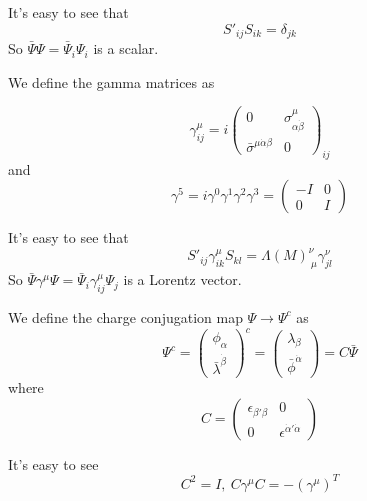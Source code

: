 \documentclass[12pt]{book}
\begin{document}
	It's easy to see that 
	\begin{equation}
		S'_{ij}S_{ik}=\delta_{jk}
	\end{equation}
	So $\bar\Psi \Psi=\bar\Psi_i \Psi_i$ is a scalar.
	
	We define the gamma matrices as
	
	\begin{equation}
		\gamma^\mu_{ij}=i\begin{pmatrix}
			0&\sigma^\mu_{\alpha\dot\beta}\\
			\bar\sigma^{\mu\dot\alpha\beta}&0
		\end{pmatrix}_{ij}
	\end{equation}
	and
	\begin{equation}
		\gamma^5=i\gamma^0\gamma^1\gamma^2\gamma^3=\begin{pmatrix}
			-I&0\\
			0&I
		\end{pmatrix}
	\end{equation}
	
	It's easy to see that
	\begin{equation}
		S'_{ij}\gamma^\mu_{ik}S_{kl}=\Lambda(M)^\nu_{\ \mu}\gamma^\nu_{jl}
	\end{equation}
	So $\bar\Psi\gamma^\mu\Psi=\bar\Psi_i\gamma^\mu_{ij}\Psi_j$ is a Lorentz vector.
	
	We define the charge conjugation map $\Psi\rightarrow\Psi^c$ as 
	\begin{equation}
		\Psi^c=\begin{pmatrix}
			\phi_\alpha\\
			\bar\lambda^{\dot\beta}
		\end{pmatrix}^c
		=\begin{pmatrix}
			\lambda_\beta\\
			\bar\phi^{\dot\alpha}
		\end{pmatrix}
		=C\bar\Psi
	\end{equation}
	where
	\begin{equation}
		C=\begin{pmatrix}
			\epsilon_{\beta'\beta}&0\\
			0&\epsilon^{\dot\alpha'\dot\alpha}
		\end{pmatrix}
	\end{equation}
	
	It's easy to see
	\begin{equation}
		C^2=I,\ C\gamma^\mu C=-(\gamma^\mu)^T
	\end{equation}
	
\end{document}

